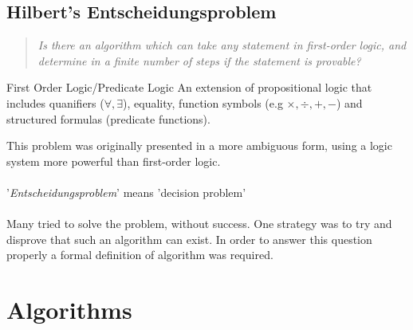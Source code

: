 \subsection{Hilbert's Entscheidungsproblem}
\begin{quote}
    \textit{Is there an algorithm which can take any statement in first-order logic, and determine in a finite number of steps if the statement is provable?}
\end{quote}
\begin{definitionbox}{First Order Logic/Predicate Logic}
    An extension of propositional logic that includes quanifiers ($\forall, \exists$), equality, function symbols (e.g $\times, \div, +, -$) and structured formulas (predicate functions).
\end{definitionbox}

\noindent This problem was originally presented in a more ambiguous form, using a logic system more powerful than first-order logic.
\\
\\ '\textit{Entscheidungsproblem}' means 'decision problem'
\\
\\ Many tried to solve the problem, without success. One strategy was to try and disprove that such an algorithm can exist.
In order to answer this question properly a formal definition of algorithm was required.
\section{Algorithms}
